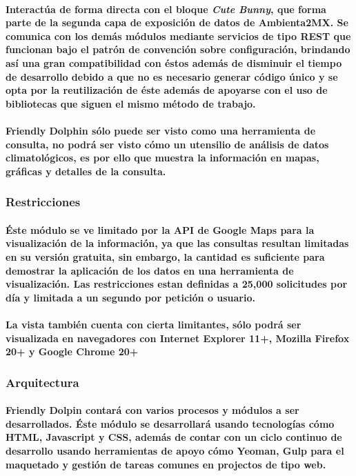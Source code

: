     \paragraph{Interactúa de forma directa con el bloque \textbf{\emph{Cute Bunny}}, que forma parte de la segunda capa de exposición de datos de Ambienta2MX. Se comunica con los demás módulos mediante servicios de tipo REST que funcionan bajo el patrón de convención sobre configuración\cite{8}, brindando así una gran compatibilidad con éstos además de disminuir el tiempo de desarrollo debido a que no es necesario generar código único y se opta por la reutilización de éste además de apoyarse con el uso de bibliotecas que siguen el mismo método de trabajo.}
    \paragraph{Friendly Dolphin sólo puede ser visto como una herramienta de consulta, no podrá ser visto cómo un utensilio de análisis de datos climatológicos, es por ello que muestra la información en mapas, gráficas y detalles de la consulta.}
  \subsubsection{Restricciones}
    \paragraph{Éste módulo se ve limitado por la API de Google Maps para la visualización de la información, ya que las consultas resultan limitadas en su versión gratuita, sin embargo, la cantidad es suficiente para demostrar la aplicación de los datos en una herramienta de visualización. Las restricciones estan definidas a 25,000 solicitudes por día y limitada a un segundo por petición o usuario.}
    \paragraph{La vista también cuenta con cierta limitantes, sólo podrá ser visualizada en navegadores con Internet Explorer 11+, Mozilla Firefox 20+ y Google Chrome 20+}
  \subsubsection{Arquitectura}
    \paragraph{Friendly Dolpin contará con varios procesos y módulos a ser desarrollados. Éste módulo se desarrollará usando tecnologías cómo HTML, Javascript y CSS, además de contar con un ciclo continuo de desarrollo usando herramientas de apoyo cómo Yeoman, Gulp para el maquetado y gestión de tareas comunes en projectos de tipo web.}
